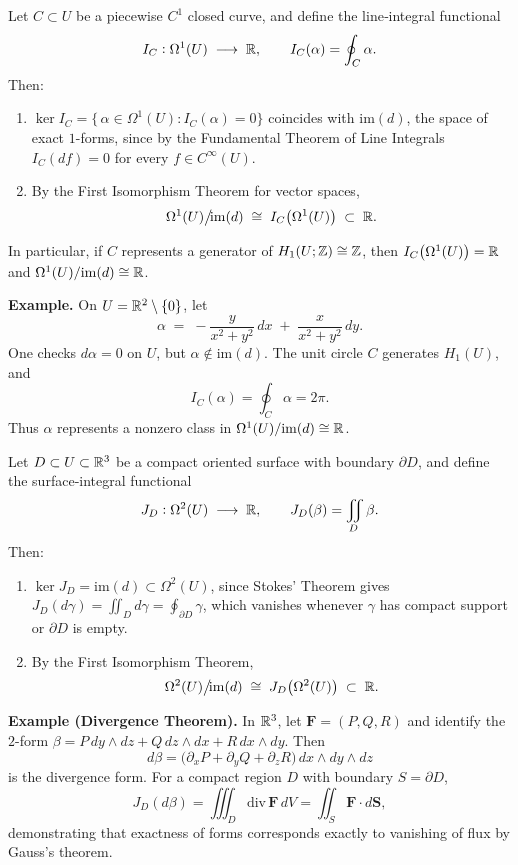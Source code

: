 \documentclass[11pt,openany]{article}
\begin{document}
\begin{proposition}
	Let \(C\subset U\) be a piecewise \(C^1\) closed curve, and define the line‐integral functional
	\[
	I_C:\Omega^1(U)\;\longrightarrow\;\mathbb{R},
	\qquad
	I_C(\alpha)=\oint_{C}\alpha.
	\]
	Then:
	\begin{enumerate}
		\item \(\displaystyle\ker I_C=\{\,\alpha\in\Omega^1(U):I_C(\alpha)=0\}\) coincides with \(\mathrm{im}(d)\), the space of exact \(1\)-forms, since by the Fundamental Theorem of Line Integrals
		\(\displaystyle I_C(df)=0\) for every \(f\in C^\infty(U)\).
		\item By the First Isomorphism Theorem for vector spaces,
		\[
		\Omega^1(U)\big/\!\mathrm{im}(d)
		\;\cong\;
		I_C\bigl(\Omega^1(U)\bigr)
		\;\subset\;\mathbb{R}.
		\]
	\end{enumerate}
	In particular, if \(C\) represents a generator of \(H_1(U;\mathbb{Z})\cong\mathbb{Z}\), then \(I_C\bigl(\Omega^1(U)\bigr)=\mathbb{R}\) and
	\(\Omega^1(U)/\mathrm{im}(d)\cong\mathbb{R}\).
	
	\medskip
	
	\noindent\textbf{Example.}  On \(U=\mathbb{R}^2\setminus\{0\}\), let
	\[
	\alpha \;=\;
	-\frac{y}{x^2+y^2}\,dx \;+\;\frac{x}{x^2+y^2}\,dy.
	\]
	One checks \(d\alpha=0\) on \(U\), but \(\alpha\not\in\mathrm{im}(d)\).  The unit circle \(C\) generates \(H_1(U)\), and
	\[
	I_C(\alpha)
	=\oint_{C}\alpha
	=2\pi.
	\]
	Thus \(\alpha\) represents a nonzero class in 
	\(\Omega^1(U)/\mathrm{im}(d)\cong\mathbb{R}\).
	
\end{proposition}

\begin{proposition}
	Let \(D\subset U\subset\mathbb{R}^3\) be a compact oriented surface with boundary \(\partial D\), and define the surface‐integral functional
	\[
	J_D:\Omega^2(U)\;\longrightarrow\;\mathbb{R},
	\qquad
	J_D(\beta)=\iint_{D}\beta.
	\]
	Then:
	\begin{enumerate}
		\item \(\ker J_D=\mathrm{im}(d)\subset\Omega^2(U)\), since Stokes’ Theorem gives
		\(\displaystyle J_D(d\gamma)=\iint_D d\gamma = \oint_{\partial D}\gamma\), which vanishes whenever \(\gamma\) has compact support or \(\partial D\) is empty.
		\item By the First Isomorphism Theorem,
		\[
		\Omega^2(U)\big/\!\mathrm{im}(d)
		\;\cong\;
		J_D\bigl(\Omega^2(U)\bigr)
		\;\subset\;\mathbb{R}.
		\]
	\end{enumerate}
	
	\medskip
	
	\noindent\textbf{Example (Divergence Theorem).}
	In \(\mathbb{R}^3\), let \(\mathbf F=(P,Q,R)\) and identify the \(2\)-form
	\(\beta = P\,dy\wedge dz + Q\,dz\wedge dx + R\,dx\wedge dy\).  Then
	\[
	d\beta = \bigl(\partial_x P + \partial_y Q + \partial_z R\bigr)\,dx\wedge dy\wedge dz
	\]
	is the divergence form.  For a compact region \(D\) with boundary \(S=\partial D\),
	\[
	J_D(d\beta)
	=\iiint_D \mathrm{div}\,\mathbf F\,dV
	=\iint_S \mathbf F\cdot d\mathbf S,
	\]
	demonstrating that exactness of forms corresponds exactly to vanishing of flux by Gauss’s theorem.
	
\end{proposition}
\end{document}
